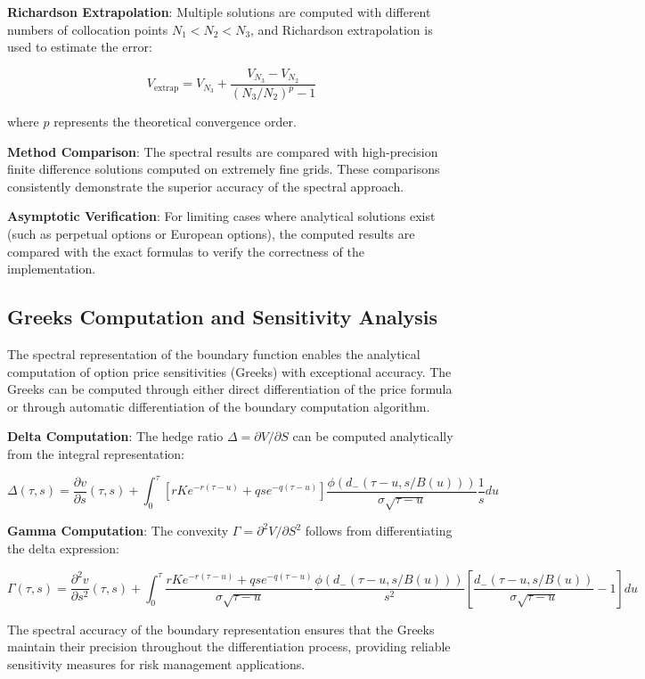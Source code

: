 \documentclass[
  american,
  11pt,
  11pt,
  letterpaper,
  onecolumn]{article}
\begin{document}
\textbf{Richardson Extrapolation}: Multiple solutions are computed with
different numbers of collocation points \(N_1 < N_2 < N_3\), and
Richardson extrapolation is used to estimate the error:

\[V_{\text{extrap}} = V_{N_3} + \frac{V_{N_3} - V_{N_2}}{(N_3/N_2)^p - 1} \tag{7.5}\]

where \(p\) represents the theoretical convergence order.

\textbf{Method Comparison}: The spectral results are compared with
high-precision finite difference solutions computed on extremely fine
grids. These comparisons consistently demonstrate the superior accuracy
of the spectral approach.

\textbf{Asymptotic Verification}: For limiting cases where analytical
solutions exist (such as perpetual options or European options), the
computed results are compared with the exact formulas to verify the
correctness of the implementation.

\subsection{Greeks Computation and Sensitivity
Analysis}\label{greeks-computation-and-sensitivity-analysis}

The spectral representation of the boundary function enables the
analytical computation of option price sensitivities (Greeks) with
exceptional accuracy. The Greeks can be computed through either direct
differentiation of the price formula or through automatic
differentiation of the boundary computation algorithm.

\textbf{Delta Computation}: The hedge ratio
\(\Delta = \partial V/\partial S\) can be computed analytically from the
integral representation:

\[\Delta(\tau,s) = \frac{\partial v}{\partial s}(\tau,s) + \int_0^\tau \left[rK e^{-r(\tau-u)} + qs e^{-q(\tau-u)}\right] \frac{\phi(d_-(\tau-u,s/B(u)))}{\sigma\sqrt{\tau-u}} \frac{1}{s} du \tag{7.6}\]

\textbf{Gamma Computation}: The convexity
\(\Gamma = \partial^2 V/\partial S^2\) follows from differentiating the
delta expression:

\[\Gamma(\tau,s) = \frac{\partial^2 v}{\partial s^2}(\tau,s) + \int_0^\tau \frac{rK e^{-r(\tau-u)} + qs e^{-q(\tau-u)}}{\sigma\sqrt{\tau-u}} \frac{\phi(d_-(\tau-u,s/B(u)))}{s^2} \left[\frac{d_-(\tau-u,s/B(u))}{\sigma\sqrt{\tau-u}} - 1\right] du \tag{7.7}\]

The spectral accuracy of the boundary representation ensures that the
Greeks maintain their precision throughout the differentiation process,
providing reliable sensitivity measures for risk management
applications.
\end{document}
